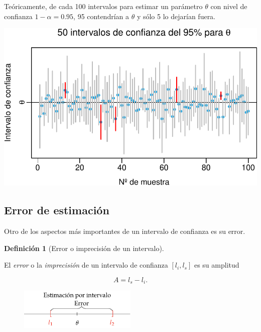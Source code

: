 \documentclass[
  a4paper,
]{scrreport}
\theoremstyle{definition}
\newtheorem{definition}{Definición}[chapter]
\theoremstyle{definition}
\theoremstyle{plain}
\theoremstyle{remark}
\begin{document}
Teóricamente, de cada 100 intervalos para estimar un parámetro
\(\theta\) con nivel de confianza \(1-\alpha=0.95\), 95 contendrían a
\(\theta\) y sólo 5 lo dejarían fuera.

\includegraphics{07-estimacion_files/figure-pdf/unnamed-chunk-1-1.pdf}

\hypertarget{error-de-estimaciuxf3n}{%
\subsection{Error de estimación}\label{error-de-estimaciuxf3n}}

Otro de los aspectos más importantes de un intervalo de confianza es su
error.

\begin{definition}[Error o imprecisión de un
intervalo]\protect\hypertarget{def-error-intervalo-confianza}{}\label{def-error-intervalo-confianza}

El \emph{error} o la \emph{imprecisión} de un intervalo de confianza
\([l_i,l_s]\) es su amplitud

\[
A=l_s-l_i.
\]

\end{definition}

\begin{figure}

{\centering \includegraphics[width=0.5\textwidth,height=\textheight]{img/estimacion/error-estimacion-intervalo.pdf}

}

\end{figure}
\end{document}
